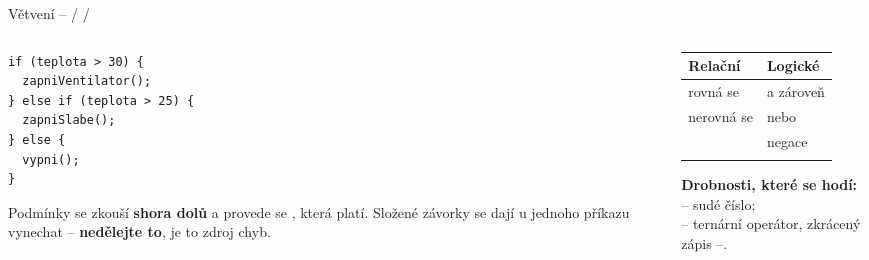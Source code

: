 \documentclass[12pt,aspectratio=169]{beamer}
\begin{document}
\begin{frame}[fragile]{Větvení --  /  / }
  \begin{columns}[T]
    \begin{column}{0.5\textwidth}
\begin{lstlisting}[style=arduino_bez_cisel]
if (teplota > 30) {
  zapniVentilator();
} else if (teplota > 25) {
  zapniSlabe();
} else {
  vypni();
}
\end{lstlisting}
      \scriptsize
      Podmínky se zkouší \textbf{shora dolů} a provede se ,
      která platí. Složené závorky se dají u jednoho příkazu vynechat --
      \textbf{nedělejte to}, je to zdroj chyb.
    \end{column}
    \begin{column}{0.46\textwidth}
      \footnotesize
      \begin{tabular}{@{}ll@{}}
        \toprule
        Relační & Logické \\
        \midrule
        \kod{==} rovná se      & \kod{\&\&} a zároveň \\
        \kod{!=} nerovná se    & \kod{||} nebo \\
        \kod{<} \kod{>}        & \kod{!} negace \\
        \kod{<=} \kod{>=}      & \\
        \bottomrule
      \end{tabular}

      \vspace{2mm}
      \scriptsize
      \textbf{Drobnosti, které se hodí:}
       -- sudé číslo; \\
       -- ternární operátor, zkrácený zápis
      --.
    \end{column}
  \end{columns}
\end{frame}
\end{document}
